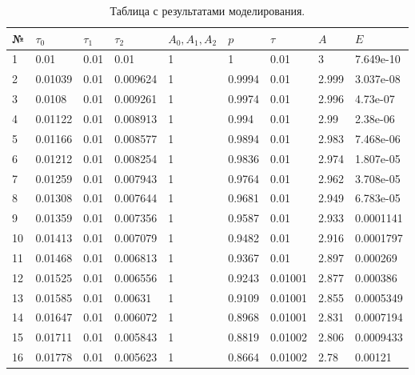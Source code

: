 \begin{table}[h!]
	\caption{Таблица с результатами моделирования.}
	\begin{tabular}{|l|l|l|l|l|l|l|l|l|}
		\hline
		№  & $\tau_0$ & $\tau_1$ & $\tau_2$ & $A_0, A_1, A_2$ & $p$    & $\tau$  & $A$   & $E$       \\ \hline
		1  & 0.01     & 0.01     & 0.01     & 1               & 1      & 0.01    & 3     & 7.649e-10 \\ \hline
		2  & 0.01039  & 0.01     & 0.009624 & 1               & 0.9994 & 0.01    & 2.999 & 3.037e-08 \\ \hline
		3  & 0.0108   & 0.01     & 0.009261 & 1               & 0.9974 & 0.01    & 2.996 & 4.73e-07  \\ \hline
		4  & 0.01122  & 0.01     & 0.008913 & 1               & 0.994  & 0.01    & 2.99  & 2.38e-06  \\ \hline
		5  & 0.01166  & 0.01     & 0.008577 & 1               & 0.9894 & 0.01    & 2.983 & 7.468e-06 \\ \hline
		6  & 0.01212  & 0.01     & 0.008254 & 1               & 0.9836 & 0.01    & 2.974 & 1.807e-05 \\ \hline
		7  & 0.01259  & 0.01     & 0.007943 & 1               & 0.9764 & 0.01    & 2.962 & 3.708e-05 \\ \hline
		8  & 0.01308  & 0.01     & 0.007644 & 1               & 0.9681 & 0.01    & 2.949 & 6.783e-05 \\ \hline
		9  & 0.01359  & 0.01     & 0.007356 & 1               & 0.9587 & 0.01    & 2.933 & 0.0001141 \\ \hline
		10 & 0.01413  & 0.01     & 0.007079 & 1               & 0.9482 & 0.01    & 2.916 & 0.0001797 \\ \hline
		11 & 0.01468  & 0.01     & 0.006813 & 1               & 0.9367 & 0.01    & 2.897 & 0.000269  \\ \hline
		12 & 0.01525  & 0.01     & 0.006556 & 1               & 0.9243 & 0.01001 & 2.877 & 0.000386  \\ \hline
		13 & 0.01585  & 0.01     & 0.00631  & 1               & 0.9109 & 0.01001 & 2.855 & 0.0005349 \\ \hline
		14 & 0.01647  & 0.01     & 0.006072 & 1               & 0.8968 & 0.01001 & 2.831 & 0.0007194 \\ \hline
		15 & 0.01711  & 0.01     & 0.005843 & 1               & 0.8819 & 0.01002 & 2.806 & 0.0009433 \\ \hline
		16 & 0.01778  & 0.01     & 0.005623 & 1               & 0.8664 & 0.01002 & 2.78  & 0.00121   \\ \hline

\end{tabular}
\end{table}
